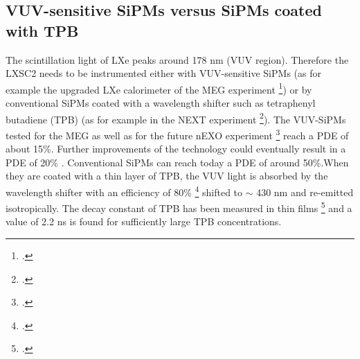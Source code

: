 \subsection*{VUV-sensitive SiPMs versus SiPMs coated with TPB}
%
%
%
%
%

The scintillation light of LXe peaks around 178 nm (VUV region). Therefore the LXSC2 needs to be instrumented either with VUV-sensitive SiPMs (as for example the upgraded LXe calorimeter of the 
MEG experiment \footcite{Ogawa:2015ucj}) or by conventional SiPMs coated with a wavelength shifter such as tetraphenyl butadiene (TPB) (as for example in the NEXT experiment \footcite{Alvarez:2013gxa}). 
The VUV-SiPMs tested for the MEG as well as for the future nEXO 
experiment \footcite{Ogawa:2015ucj,Ostrovskiy:2015oja} reach a PDE of about 
15\%. Further improvements of the technology could eventually result in a PDE of 20\% .  Conventional SiPMs can reach today a PDE of around 50\%.When they are coated with a thin layer of TPB, the VUV light is absorbed by the wavelength shifter with an efficiency of 80\% \footcite{Gehman:2011xm}
shifted to $\sim$ 430 nm and re-emitted isotropically. The decay constant of TPB has been measured  in thin films \footcite{TPBtau} and a value of 2.2 ns is found for sufficiently large TPB concentrations. 

